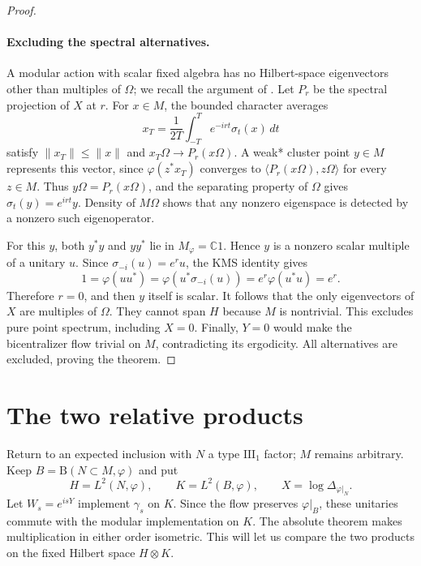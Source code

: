 \documentclass[11pt]{article}
\theoremstyle{definition}
\newcommand{\B}{\mathrm B}
\newcommand{\C}{\mathbb C}
\begin{document}
\begin{proof}
\paragraph{Excluding the spectral alternatives.}
A modular action with scalar fixed algebra has
no Hilbert-space eigenvectors other than multiples of $\Omega$; we recall
the argument of \cite[Lemma~2.1]{MarrakchiVaes2024}. Let $P_r$ be the spectral
projection of $X$ at $r$. For $x\in M$, the bounded character averages
\[
 x_T=\frac1{2T}\int_{-T}^T e^{-irt}\sigma_t(x)\,dt
\]
satisfy $\|x_T\|\le\|x\|$ and $x_T\Omega\to P_r(x\Omega)$.
A weak* cluster point $y\in M$ represents this vector, since
$\varphi(z^*x_T)$ converges to $\langle P_r(x\Omega),z\Omega\rangle$ for
every $z\in M$. Thus $y\Omega=P_r(x\Omega)$, and the separating property
of $\Omega$ gives $\sigma_t(y)=e^{irt}y$. Density of $M\Omega$ shows that
any nonzero eigenspace is detected by a nonzero such eigenoperator.

For this $y$, both $y^*y$ and $yy^*$ lie in $M_\varphi=\C1$. Hence $y$ is
a nonzero scalar multiple of a unitary $u$. Since
$\sigma_{-i}(u)=e^r u$, the KMS identity gives
\[
 1=\varphi(uu^*)=\varphi(u^*\sigma_{-i}(u))
   =e^r\varphi(u^*u)=e^r.
\]
Therefore $r=0$, and then $y$ itself is scalar. It follows that the only
eigenvectors of $X$ are multiples of $\Omega$. They cannot span $H$ because
$M$ is nontrivial. This excludes pure point spectrum, including $X=0$.
Finally, $Y=0$ would make the bicentralizer flow trivial on $M$, contradicting
its ergodicity. All alternatives are excluded, proving the theorem.
\end{proof}
\section{The two relative products}\label{sec:products}
Return to an expected inclusion with $N$ a type $\mathrm{III}_1$ factor;
$M$ remains arbitrary. Keep $B=\B(N\subset M,\varphi)$ and put
\[
 H=L^2(N,\varphi),\qquad K=L^2(B,\varphi),\qquad
 X=\log\Delta_{\varphi|_N}.
\]
Let $W_s=e^{isY}$ implement $\gamma_s$ on $K$. Since the flow preserves
$\varphi|_B$, these unitaries commute with the modular implementation on $K$.
The absolute theorem makes multiplication in either order isometric. This
will let us compare the two products on the fixed Hilbert space $H\otimes K$.
\end{document}
